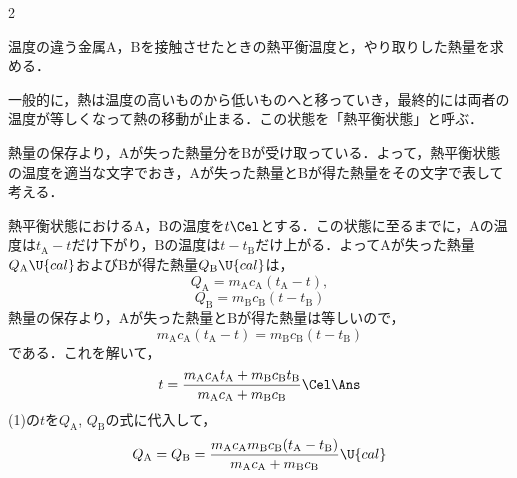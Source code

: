 \begin{multicols}{2}
\begin{saikei}
温度の違う金属$\mathrm{A}$，$\mathrm{B}$を接触させたときの熱平衡温度と，やり取りした熱量を求める．
\end{saikei}
\begin{sisin}
一般的に，熱は温度の高いものから低いものへと移っていき，最終的には両者の温度が等しくなって熱の移動が止まる．この状態を「熱平衡状態」と呼ぶ．

熱量の保存より，$\mathrm{A}$が失った熱量分を$\mathrm{B}$が受け取っている．よって，熱平衡状態の温度を適当な文字でおき，$\mathrm{A}$が失った熱量と$\mathrm{B}$が得た熱量をその文字で表して考える．
\end{sisin}
\begin{kaitou}
\begin{komon}
 熱平衡状態における$\mathrm{A}$，$\mathrm{B}$の温度を$t\Cel$とする．この状態に至るまでに，$\mathrm{A}$の温度は$t_{\mathrm{A}}-t$だけ下がり，$\mathrm{B}$の温度は$t-t_{\mathrm{B}}$だけ上がる．よって$\mathrm{A}$が失った熱量$Q_{\mathrm{A}}\U{cal}$および$\mathrm{B}$が得た熱量$Q_{\mathrm{B}}\U{cal}$は，
       \[Q_{\mathrm{A}}=m_{\mathrm{A}}c_{\mathrm{A}}(t_{\mathrm{A}}-t),\]
       \[Q_{\mathrm{B}}=m_{\mathrm{B}}c_{\mathrm{B}}(t-t_{\mathrm{B}})\]
       \hspace{1zw}熱量の保存より，$\mathrm{A}$が失った熱量と$\mathrm{B}$が得た熱量は等しいので，
       \[m_{\mathrm{A}}c_{\mathrm{A}}(t_{\mathrm{A}}-t)=m_{\mathrm{B}}c_{\mathrm{B}}(t-t_{\mathrm{B}})\]
       である．これを解いて，
       \[t=\frac{m_{\mathrm{A}}c_{\mathrm{A}}t_{\mathrm{A}}+m_{\mathrm{B}}c_{\mathrm{B}}t_{\mathrm{B}}}{m_{\mathrm{A}}c_{\mathrm{A}}+m_{\mathrm{B}}c_{\mathrm{B}}}\Cel\Ans\]
 (1)の$t$を$Q_{\mathrm{A}}$, $Q_{\mathrm{B}}$の式に代入して，
       \[Q_{\mathrm{A}}=Q_{\mathrm{B}}=\frac{m_{\mathrm{A}}c_{\mathrm{A}}m_{\mathrm{B}}c_{\mathrm{B}}(t_{\mathrm{A}}-t_{\mathrm{B}})}{m_{\mathrm{A}}c_{\mathrm{A}}+m_{\mathrm{B}}c_{\mathrm{B}}}\U{cal}\]
       \hspace*{\fill}\Ans
\end{komon}


\end{kaitou}
\end{multicols}
